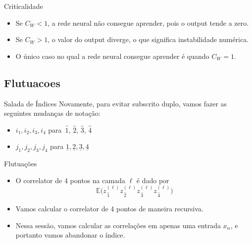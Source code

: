 \documentclass{beamer}
\newcommand{\EE}{\mathbb{E}}
\newcommand{\aaA}{\alpha}
\newcommand{\aaB}{\beta}
\def\mi#1{{\,\widehat{#1}}}
\def\mj#1{\underline{#1}}
\def\eell{{(\ell)}}
\begin{document}
\begin{frame}{Criticalidade}
	\begin{itemize}
		\item Se $C_W < 1$, a rede neural não consegue aprender, pois o output tende a zero.
		\item Se $C_W > 1$, o valor do output diverge, o que significa instabilidade numérica.
		\item O único caso no qual a rede neural consegue aprender é quando $C_W = 1$.
	\end{itemize}
\end{frame}

	
 
\subsection{Flutuacoes}

\begin{frame}
	\tableofcontents[currentsubsection]
\end{frame}

\begin{frame}{Salada de Índices}
	Novamente, para evitar subscrito duplo, vamos fazer as seguintes mudanças de notação:
	\begin{itemize}
		\item $i_1, i_2, i_3, i_4$ para $\mi1, \mi2, \mi3, \mi4$ 
		\item $j_1, j_2, j_3, j_4$ para $\mj1, \mj2, \mj3, \mj4$
	\end{itemize}
\end{frame}

\begin{frame}{Flutuações}
	\begin{itemize}
		\item O correlator de 4 pontos na camada $\ell$ é dado por
		$$\EE\big(z^\eell_{\mi1} z^\eell_{\mi2} z^\eell_{\mi3} z^\eell_{\mi4}\big)$$
		\item Vamos calcular o correlator de 4 pontos de maneira recursiva.
		\item Nessa sessão, vamos calcular as correlações em apenas uma entrada $x_\aaA$, e portanto vamos abandonar o índice.
	\end{itemize}
	
\end{frame}
\end{document}
